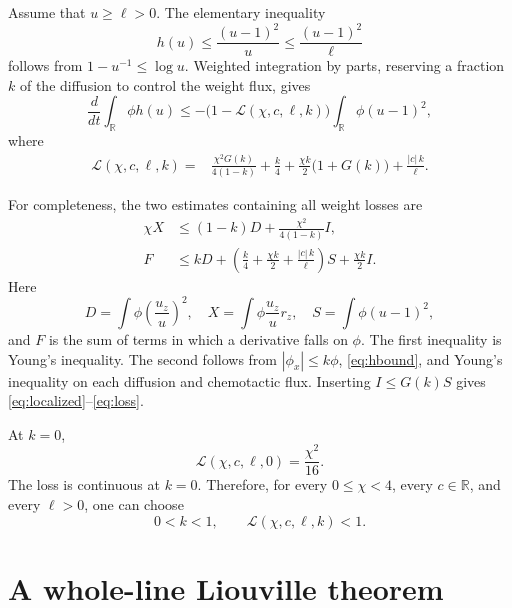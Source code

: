 \documentclass[11pt]{article}
\newcommand{\R}{\mathbb{R}}
\newcommand{\abs}[1]{\left\lvert #1\right\rvert}
\begin{document}
Assume that \(u\ge\ell>0\).  The elementary inequality
\begin{equation}
 h(u)\le\frac{(u-1)^2}{u}\le\frac{(u-1)^2}{\ell}        \label{eq:hbound}
\end{equation}
follows from \(1-u^{-1}\le\log u\).  Weighted integration by parts, reserving
a fraction \(k\) of the diffusion to control the weight flux, gives
\begin{equation}
 \frac{d}{dt}\int_\R\phi h(u)
 \le-\bigl(1-\mathcal L(\chi,c,\ell,k)\bigr)
       \int_\R\phi(u-1)^2,                             \label{eq:localized}
\end{equation}
where
\begin{equation}
\begin{aligned}
 \mathcal L(\chi,c,\ell,k)
 ={}&\frac{\chi^2G(k)}{4(1-k)}
     +\frac{k}{4}
     +\frac{\chi k}{2}\bigl(1+G(k)\bigr)
     +\frac{\abs c\,k}{\ell}.                          \label{eq:loss}
\end{aligned}
\end{equation}

For completeness, the two estimates containing all weight losses are
\begin{align*}
 \chi X
 &\le(1-k)D+\frac{\chi^2}{4(1-k)}I,\\
 F
 &\le kD+
 \left(\frac{k}{4}+\frac{\chi k}{2}
              +\frac{\abs c\,k}{\ell}\right)S
 +\frac{\chi k}{2}I.
\end{align*}
Here
\[
 D=\int\phi\left(\frac{u_z}{u}\right)^2,\quad
 X=\int\phi\frac{u_z}{u}r_z,\quad
 S=\int\phi(u-1)^2,
\]
and \(F\) is the sum of terms in which a derivative falls on \(\phi\).
The first inequality is Young's inequality.  The second follows from
\(\abs{\phi_x}\le k\phi\), \eqref{eq:hbound}, and Young's inequality on
each diffusion and chemotactic flux.  Inserting \(I\le G(k)S\) gives
\eqref{eq:localized}--\eqref{eq:loss}.

At \(k=0\),
\[
 \mathcal L(\chi,c,\ell,0)=\frac{\chi^2}{16}.
\]
The loss is continuous at \(k=0\).  Therefore, for every
\(0\le\chi<4\), every \(c\in\R\), and every \(\ell>0\), one can choose
\begin{equation}
 0<k<1,\qquad \mathcal L(\chi,c,\ell,k)<1.              \label{eq:kchoice}
\end{equation}

\section{A whole-line Liouville theorem}
\end{document}
